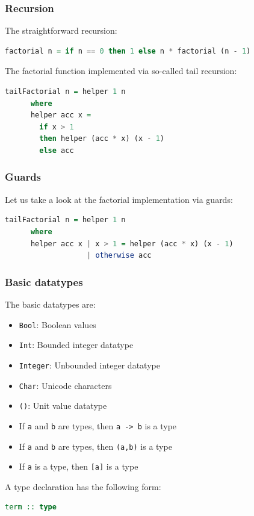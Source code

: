 \documentclass[10pt,pdf,utf8,russian,aspectratio=169]{beamer}
\begin{document}
\begin{frame}[fragile]
  \frametitle{Recursion}

  The straightforward recursion:
  \begin{lstlisting}[language=Haskell]
    factorial n = if n == 0 then 1 else n * factorial (n - 1)
  \end{lstlisting}

  \vspace{\baselineskip}

  The factorial function implemented via so-called tail recursion:
  \begin{lstlisting}[language=Haskell]
    tailFactorial n = helper 1 n
      where
      helper acc x =
        if x > 1
        then helper (acc * x) (x - 1)
        else acc
  \end{lstlisting}
\end{frame}

\begin{frame}[fragile]
  \frametitle{Guards}

  Let us take a look at the factorial implementation via guards:

  \begin{lstlisting}[language=Haskell]
    tailFactorial n = helper 1 n
      where
      helper acc x | x > 1 = helper (acc * x) (x - 1)
                   | otherwise acc
  \end{lstlisting}
\end{frame}

\begin{frame}[fragile]
  \frametitle{Basic datatypes}
  The basic datatypes are:
  \begin{itemize}
    \item \verb"Bool": Boolean values
    \item \verb"Int": Bounded integer datatype
    \item \verb"Integer": Unbounded integer datatype
    \item \verb"Char": Unicode characters
    \item \verb"()": Unit value datatype
    \item If \verb"a" and \verb"b" are types, then \verb"a -> b" is a type
    \item If \verb"a" and \verb"b" are types, then \verb"(a,b)" is a type
    \item If \verb"a" is a type, then \verb"[a]" is a type
  \end{itemize}

  A type declaration has the following form:

  \begin{lstlisting}[language=Haskell]
    term :: type
  \end{lstlisting}
\end{frame}
\end{document}
